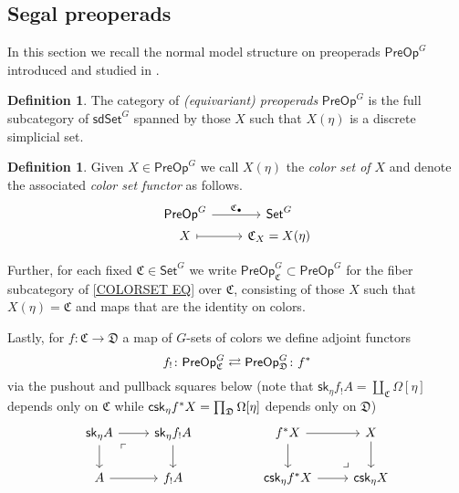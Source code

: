 \documentclass[a4paper,10pt]{article}%
\numberwithin{equation}{section}
\numberwithin{figure}{section}
\theoremstyle{definition} %
\newtheorem{definition}[equation]{Definition}%
\newcommand{\1}{\ensuremath{\mathbbm 1}}%
\begin{document}
\subsection{Segal preoperads}
\label{SPREOP_SEC}


In this section we recall the normal model structure on preoperads
$\mathsf{PreOp}^G$
introduced and studied in \cite[\S 4 and \S 5]{BP_edss}.

\begin{definition}\label{PREOP DEF} 
	The category of \textit{(equivariant) preoperads} $\mathsf{PreOp}^G$ is the full subcategory of $\mathsf{sdSet}^G$ spanned by those $X$ such that
	$X(\eta)$ is a discrete simplicial set.
\end{definition}



\begin{definition}
	Given $X \in \mathsf{PreOp}^G$ we call $X(\eta)$ the 
	\emph{color set of $X$}
	and denote the associated \emph{color set functor} as follows.
	\begin{equation}\label{COLORSET EQ}
	\begin{tikzcd}[row sep=0]
	\mathsf{PreOp}^G \ar{r}{\mathfrak{C}_{\bullet}} &
	\mathsf{Set}^G
	\\
	X \ar[mapsto]{r} &
	\mathfrak{C}_X = X(\eta)
	\end{tikzcd}
	\end{equation}

Further, for each fixed $\mathfrak{C} \in \mathsf{Set}^G$ we write 
$\mathsf{PreOp}^G_{\mathfrak{C}} \subset \mathsf{PreOp}^G$
for the fiber subcategory of 
\eqref{COLORSET EQ}
over $\mathfrak{C}$,
consisting of those $X$
such that $X(\eta) = \mathfrak{C}$
and maps that are the identity on colors.	
	
	
	Lastly, for $f \colon \mathfrak{C} \to \mathfrak{D}$
	a map of $G$-sets of colors
	we define adjoint functors
\[
	f_{!} \colon
	\mathsf{PreOp}^{G}_{\mathfrak{C}}
	\rightleftarrows
	\mathsf{PreOp}^{G}_{\mathfrak{D}}
	\colon f^{\**}
\]
	via the pushout and pullback squares below
	(note that 
	$\mathsf{sk}_{\eta} f_! A = \coprod_{\mathfrak{C}} \Omega[\eta]$ depends only on 
	$\mathfrak{C}$ while 
	$\mathsf{csk}_{\eta} f^{\**} X
	= \prod_{\mathfrak{D}} \Omega[\eta]$ depends only on
	$\mathfrak{D}$)
	\[
	\begin{tikzcd}
	\mathsf{sk}_{\eta} A \ar{r} \ar{d} \arrow[dr, phantom, "\ulcorner", very near start]  &
	\mathsf{sk}_{\eta} f_! A \ar{d}
	&&
	f^{\**} X \ar{r} \ar{d} &
	X \ar{d}
	\\
	A \ar{r} & 
	f_! A
	&&
	\mathsf{csk}_{\eta} f^{\**} X \ar{r} & 
	\mathsf{csk}_{\eta} X
	\arrow[ul, phantom, "\lrcorner", very near start]
	\end{tikzcd}
	\]
\end{definition}
\end{document}
